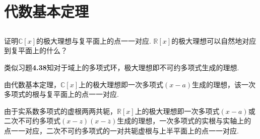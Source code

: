 \section{代数基本定理}
\subsection{}
证明$\mathbb{C}[x]$的极大理想与复平面上的点一一对应. $\mathbb{R}[x]$的极大理想可以自然地对应到复平面上的什么？

\jie 类似{\heiti 习题}\textbf{4.38}知对于域上的多项式环，极大理想即不可约多项式生成的理想.

由代数基本定理，$\mathbb{C}[x]$上的极大理想即一次多项式$(x-a)$生成的理想，该一次多项式的根与复平面上的点一一对应.

由于实系数多项式的虚根两两共轭，$\mathbb{R}[x]$上的极大理想即一次多项式$(x-a)$或二次不可约多项式$(x-z)(x-\overline{z})$生成的理想，一次多项式的实根与实轴上的点一一对应，二次不可约多项式的一对共轭虚根与上半平面上的点一一对应.